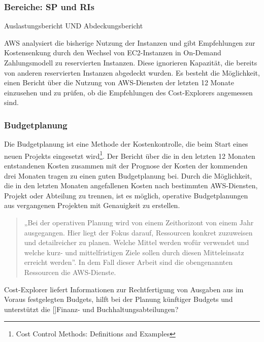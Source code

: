\subsubsection*{Bereiche: SP und RIs}
Auslastungsbericht UND
Abdeckungsbericht


AWS analysiert die bisherige Nutzung der Instanzen und gibt Empfehlungen zur Kostensenkung durch den Wechsel von EC2-Instanzen in On-Demand Zahlungsmodell zu reservierten Instanzen. Diese ignorieren Kapazität, die bereits von anderen reservierten Instanzen abgedeckt wurden.
Es besteht die Möglichkeit, einen Bericht über die Nutzung von AWS-Diensten der letzten 12 Monate einzusehen und zu prüfen, ob die Empfehlungen des Cost-Explorers angemessen sind.

\subsubsection*{Budgetplanung}
Die Budgetplanung ist eine Methode der Kostenkontrolle, die beim Start eines neuen Projekts eingesetzt wird\footnote{\cite{BUD2}Cost Control Methods: Definitions and Examples}. Der Bericht über die in den letzten 12 Monaten entstandenen Kosten zusammen mit der Prognose der Kosten der kommenden drei Monaten tragen zu einen guten Budgetplanung bei.
Durch die Möglichkeit, die in den letzten Monaten angefallenen Kosten nach bestimmten AWS-Diensten, Projekt oder Abteilung zu trennen, ist es möglich, operative Budgetplanungen aus vergangenen Projekten mit Genauigkeit zu erstellen. 
\begin{quote}
  „Bei der operativen Planung wird von einem Zeithorizont von einem Jahr ausgegangen. Hier liegt der Fokus darauf, Ressourcen konkret zuzuweisen und detailreicher zu planen. Welche Mittel werden wofür verwendet und welche kurz- und mittelfristigen Ziele sollen durch diesen Mitteleinsatz erreicht werden”\cite{BUD1}.
  In dem Fall dieser Arbeit sind die obengenannten Ressourcen die AWS-Dienste.
\end{quote}

Cost-Explorer liefert Informationen zur Rechtfertigung von Ausgaben aus im Voraus festgelegten Budgets, hilft bei der Planung künftiger Budgets und unterstützt die []Finanz- und Buchhaltungsabteilungen?
